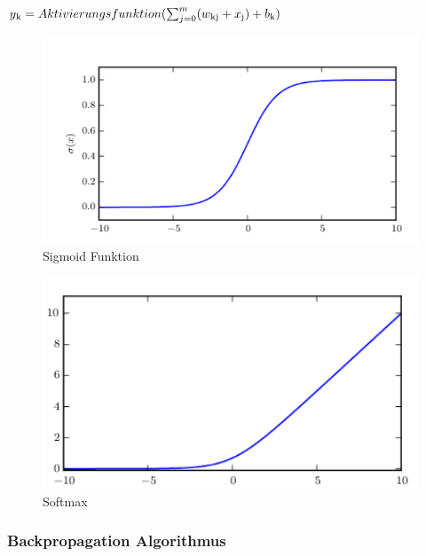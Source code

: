\documentclass{llncs}
\begin{document}
\begin{math}
y\textsubscript{k} = Aktivierungsfunktion(\sum_{j=0}^{m}(w\textsubscript{kj}+x\textsubscript{j})+b\textsubscript{k})                
\end{math}

\begin{figure}[htbp] 
	\centering
	\includegraphics[width=1.0\textwidth]{sigmoid.png}
	\caption{Sigmoid Funktion}
	\label{fig:Bild3}
\end{figure}

\begin{figure}[htbp] 
	\centering
	\includegraphics[width=1.0\textwidth]{softmax.png}
	\caption{Softmax}
	\label{fig:Bild4}
\end{figure}


\subsubsection{Backpropagation Algorithmus}
\end{document}
